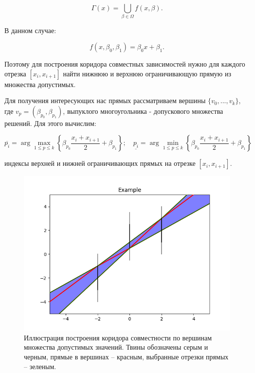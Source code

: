 \begin{equation}
    \Gamma(x)=\bigcup_{\beta \in \Omega}f(x,\beta).
\end{equation}

В данном случае:

\begin{equation}
    f(x,\beta_0,\beta_1)=\beta_0x+\beta_1.
\end{equation}

Поэтому для построения коридора совместных зависимостей нужно для каждого отрезка $[x_i, x_{i+1}]$ найти нижнюю и верхнюю ограничивающую прямую из множества допустимых.

Для получения интересующих нас прямых рассматриваем вершины $\{v_0, ..., v_k\}$, где $v_p = (\beta_{p_0}, \beta_{p_1})$, выпуклого многоугольника - допускового множества решений. Для этого вычислим:

\begin{equation}
    \overline{p_i} = \arg\max_{1 \leq p \leq k}{\left\{ \beta_{p_0} \frac{x_i + x_{i+1}}{2} + \beta_{p_1} \right\}} 
    ;\quad 
    \underline{p_i} = \arg\min_{1 \leq p \leq k}{\left\{ \beta_{p_0} \frac{x_i + x_{i+1}}{2} + \beta_{p_1} \right\}}
\end{equation}

\noindent индексы верхней и нижней ограничивающих прямых на отрезке $[x_i, x_{i+1}]$.

\begin{figure}[H]
    \centering
    \includegraphics[width=0.8\linewidth]{image/example.png}
    \caption{Иллюстрация построения коридора совместности по вершинам множества допустимых значений. Твины обозначены серым и черным, прямые в вершинах -- красным, выбранные отрезки прямых -- зеленым.}
    \label{fig:chip}
\end{figure}


